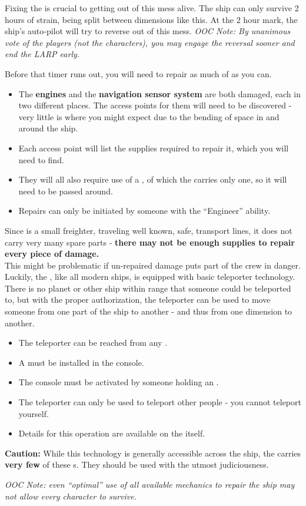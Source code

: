 \documentclass[green]{TMFHope}
\begin{document}
\name{\gFixTheShip{}}

Fixing the \pNew{} is crucial to getting out of this mess alive. The ship can only survive 2 hours of strain, being split between dimensions like this. At the 2 hour mark, the ship's auto-pilot will try to reverse out of this mess. \emph{OOC Note: By unanimous vote of the players (not the characters), you may engage the reversal sooner and end the LARP early.}

Before that timer runs out, you will need to repair as much of \pNew{} as you can. 
\begin{itemize}
  \item The \textbf{engines} and the \textbf{navigation sensor system} are both damaged, each in two different places. The access points for them will need to be discovered - very little is where you might expect due to the bending of space in and around the ship. 
  \item Each access point will list the supplies required to repair it, which you will need to find. 
	\item They will all also require use of a \textbf{\iTorch{\MYname{}}}, of which the \pNew{} carries only one, so it will need to be passed around.
	\item Repairs can only be initiated by someone with the ``Engineer'' ability.
\end{itemize}
Since \pNew{} is a small freighter, traveling well known, safe, transport lines, it does not carry very many spare parts - \textbf{there may not be enough supplies to repair every piece of damage.}\\

This might be problematic if un-repaired damage puts part of the crew in danger. Luckily, the \pNew{}, like all modern ships, is equipped with basic teleporter technology. There is no planet or other ship within range that someone could be teleported to, but with the proper authorization, the teleporter can be used to move someone from one part of the ship to another - and thus from one dimension to another.

\begin{itemize}
  \item The teleporter can be reached from any \sConsole{}.
  \item A \iCrystal{\MYname{}} must be installed in the console.
	\item The console must be activated by someone holding an \iKey{\MYname{}}.
	\item The teleporter can only be used to teleport other people - you cannot teleport yourself.
	\item Details for this operation are available on the \sConsole{} itself.
\end{itemize}
\textbf{Caution:} While this technology is generally accessible across the ship, the \pNew{} carries \textbf{very few} of these \iCrystal{\MYname{}}s. They should be used with the utmost judiciousness. 

\emph{OOC Note: even ``optimal'' use of all available mechanics to repair the ship may not allow every character to survive.}
\end{document}
